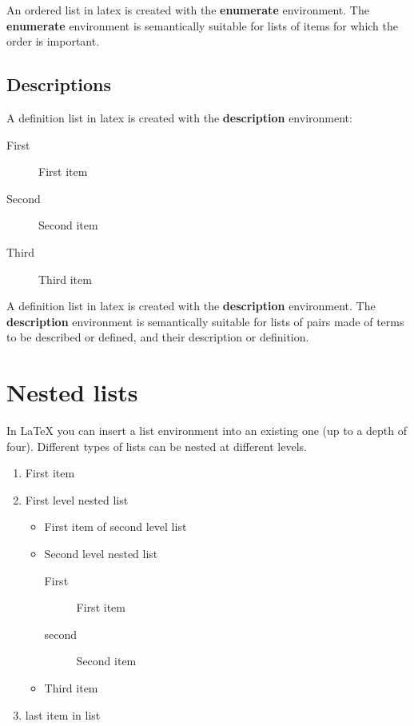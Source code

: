 \documentclass[a4paper]{report}
\begin{document}
An ordered list in latex is created with the \textbf{enumerate} environment.
The \textbf{enumerate} environment is semantically suitable for lists of items
for which the order is important.


\subsection{Descriptions}

A definition list in latex is created with the \textbf{description} environment:

\begin{description}
    \item[First] First item
    \item[Second] Second item
    \item[Third] Third item
\end{description}

A definition list in latex is created with the \textbf{description} environment.
The \textbf{description} environment is semantically suitable for lists of
pairs made of terms to be described or defined, and their description or
definition.


\section{Nested lists}

In LaTeX you can insert a list environment into an existing one (up to a depth
of four). Different types of lists can be nested at different levels.

\begin{enumerate}
    \item First item
    \item First level nested list
    \begin{itemize}
        \item First item of second level list
        \item Second level nested list
        \begin{description}
            \item[First] First item
            \item[second] Second item
        \end{description}
        \item Third item
    \end{itemize}
    \item last item in list
\end{enumerate}
\end{document}
